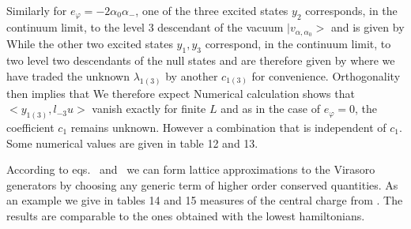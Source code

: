 Similarly for $e_{\varphi}=-2\alpha_0\alpha_-$, one of the
 three excited states $y_2$ corresponds,
 in the continuum limit, to the level 3 descendant of the vacuum
 $|v_{\alpha,\alpha_0}>$ and is given by
%
\eqn{}
%
While the other two excited states $y_1,y_3$ correspond,
 in the continuum limit, to  two level two descendants
 of the null states and are therefore  given by
%
\eqn{}
%
where we have
traded the unknown $\lambda_{1(3)}$ by another  $c_{1(3)}$ for convenience.
 Orthogonality then implies that
%
\eqn{}
%
We therefore expect
%
\eqn{}
%
Numerical calculation shows that $<y_{1(3)},l_{-3}u>$ vanish exactly
 for finite $L$ and as in the case of $e_{\varphi}=0$,
the coefficient $c_{1}$ remains unknown. However
%
\eqn{}
%
a combination that is independent of $c_1$.  Some numerical values  are given
in table 12 and 13.




According to eqs. \clhi\ and \clhii\ we can form lattice approximations to the
Virasoro generators by choosing any generic term of higher order conserved
quantities. As an example we give in tables 14 and 15 measures of the central
charge from \tataix. The results are comparable to the ones obtained with the
lowest hamiltonians.

